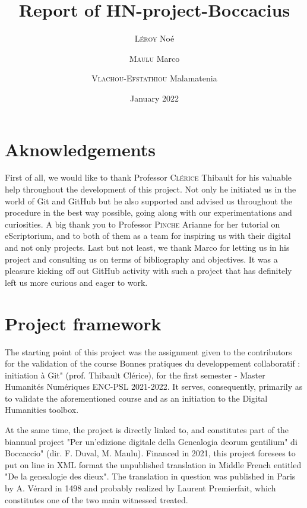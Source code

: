 \documentclass[12pt]{article}
\begin{document}
\title{Report of HN-project-Boccacius }
\date{January 2022}
\author{\textsc{Léroy }Noé \and {\textsc{Maulu } Marco}\and {\textsc{Vlachou-Efstathiou } Malamatenia }}

\maketitle

\clearpage

\section{Aknowledgements}

First of all, we would like to thank Professor \textsc{Clérice} Thibault for his valuable help throughout the development of this project. Not only he initiated us in the world of Git and GitHub but he also supported and advised us throughout the procedure in the best way possible, going along with our experimentations and curiosities. A big thank you to Professor \textsc{Pinche} Arianne for her tutorial on eScriptorium, and to both of them as a team for inspiring us with their digital and not only projects. Last but not least, we thank Marco for letting us in his project and consulting us on terms of bibliography and objectives. It was a pleasure kicking off out GitHub activity with such a project that has definitely left us more curious and eager to work.


\section{Project framework}

The starting point of this project was the assignment given to the contributors for the validation of the course Bonnes pratiques du developpement collaboratif : initiation à Git" (prof. Thibault Clérice), for the first semester - Master Humanités Numériques ENC-PSL 2021-2022. It serves, consequently, primarily as to validate the aforementioned course and as an  initiation to the Digital Humanities toolbox.

At the same time, the project is directly linked to, and constitutes part of the biannual project "Per un'edizione digitale della Genealogia deorum gentilium" di Boccaccio" (dir. F. Duval, M. Maulu). Financed in 2021, this project foresees to put on line in XML format the unpublished translation in Middle French entitled "De la genealogie des dieux". The translation in question was published in Paris by A. Vérard in 1498 and probably realized by Laurent Premierfait, which constitutes one of the two main witnessed treated.\\
\end{document}
